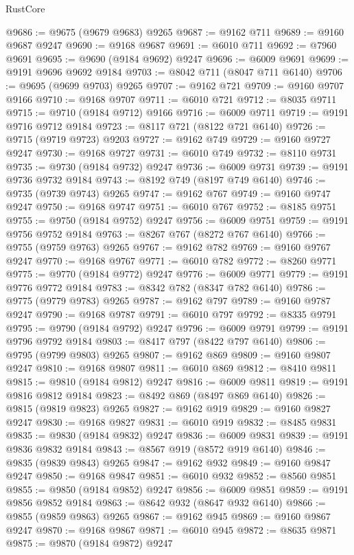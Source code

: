 \begin{lexlean}{RustCore}
\begin{coremodule}
@9686 := @9675 (@9679 @9683) @9265
@9687 := @9162 @711
@9689 := @9160 @9687 @9247
@9690 := @9168 @9687
@9691 := @6010 @711
@9692 := @7960 @9691
@9695 := @9690 (@9184 @9692) @9247
@9696 := @6009 @9691
@9699 := @9191 @9696 @9692 @9184
@9703 := @8042 @711 (@8047 @711 @6140)
@9706 := @9695 (@9699 @9703) @9265
@9707 := @9162 @721
@9709 := @9160 @9707 @9166
@9710 := @9168 @9707
@9711 := @6010 @721
@9712 := @8035 @9711
@9715 := @9710 (@9184 @9712) @9166
@9716 := @6009 @9711
@9719 := @9191 @9716 @9712 @9184
@9723 := @8117 @721 (@8122 @721 @6140)
@9726 := @9715 (@9719 @9723) @9203
@9727 := @9162 @749
@9729 := @9160 @9727 @9247
@9730 := @9168 @9727
@9731 := @6010 @749
@9732 := @8110 @9731
@9735 := @9730 (@9184 @9732) @9247
@9736 := @6009 @9731
@9739 := @9191 @9736 @9732 @9184
@9743 := @8192 @749 (@8197 @749 @6140)
@9746 := @9735 (@9739 @9743) @9265
@9747 := @9162 @767
@9749 := @9160 @9747 @9247
@9750 := @9168 @9747
@9751 := @6010 @767
@9752 := @8185 @9751
@9755 := @9750 (@9184 @9752) @9247
@9756 := @6009 @9751
@9759 := @9191 @9756 @9752 @9184
@9763 := @8267 @767 (@8272 @767 @6140)
@9766 := @9755 (@9759 @9763) @9265
@9767 := @9162 @782
@9769 := @9160 @9767 @9247
@9770 := @9168 @9767
@9771 := @6010 @782
@9772 := @8260 @9771
@9775 := @9770 (@9184 @9772) @9247
@9776 := @6009 @9771
@9779 := @9191 @9776 @9772 @9184
@9783 := @8342 @782 (@8347 @782 @6140)
@9786 := @9775 (@9779 @9783) @9265
@9787 := @9162 @797
@9789 := @9160 @9787 @9247
@9790 := @9168 @9787
@9791 := @6010 @797
@9792 := @8335 @9791
@9795 := @9790 (@9184 @9792) @9247
@9796 := @6009 @9791
@9799 := @9191 @9796 @9792 @9184
@9803 := @8417 @797 (@8422 @797 @6140)
@9806 := @9795 (@9799 @9803) @9265
@9807 := @9162 @869
@9809 := @9160 @9807 @9247
@9810 := @9168 @9807
@9811 := @6010 @869
@9812 := @8410 @9811
@9815 := @9810 (@9184 @9812) @9247
@9816 := @6009 @9811
@9819 := @9191 @9816 @9812 @9184
@9823 := @8492 @869 (@8497 @869 @6140)
@9826 := @9815 (@9819 @9823) @9265
@9827 := @9162 @919
@9829 := @9160 @9827 @9247
@9830 := @9168 @9827
@9831 := @6010 @919
@9832 := @8485 @9831
@9835 := @9830 (@9184 @9832) @9247
@9836 := @6009 @9831
@9839 := @9191 @9836 @9832 @9184
@9843 := @8567 @919 (@8572 @919 @6140)
@9846 := @9835 (@9839 @9843) @9265
@9847 := @9162 @932
@9849 := @9160 @9847 @9247
@9850 := @9168 @9847
@9851 := @6010 @932
@9852 := @8560 @9851
@9855 := @9850 (@9184 @9852) @9247
@9856 := @6009 @9851
@9859 := @9191 @9856 @9852 @9184
@9863 := @8642 @932 (@8647 @932 @6140)
@9866 := @9855 (@9859 @9863) @9265
@9867 := @9162 @945
@9869 := @9160 @9867 @9247
@9870 := @9168 @9867
@9871 := @6010 @945
@9872 := @8635 @9871
@9875 := @9870 (@9184 @9872) @9247

\end{coremodule}
\end{lexlean}
